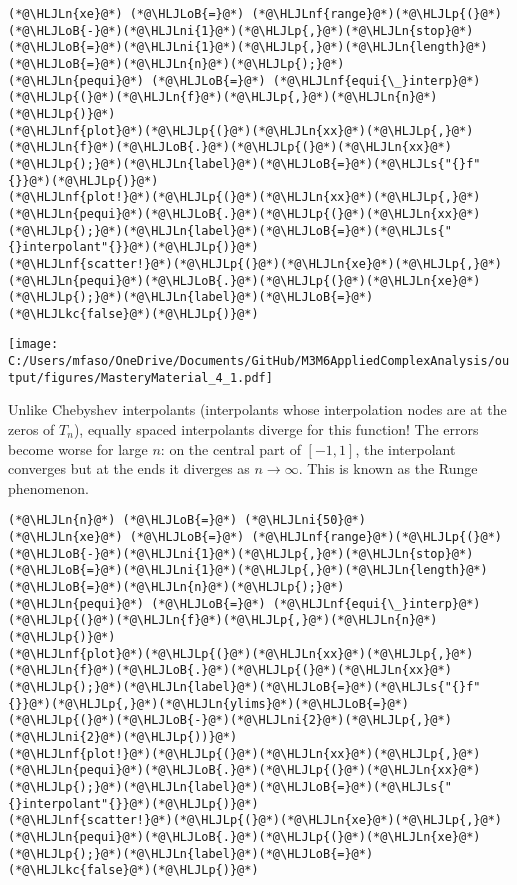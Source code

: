 \documentclass[12pt,a4paper]{article}
\newcommand{\HLJLkc}[1]{\textcolor[RGB]{59,151,46}{\textit{#1}}}
\newcommand{\HLJLn}[1]{#1}
\newcommand{\HLJLnf}[1]{\textcolor[RGB]{66,102,213}{#1}}
\newcommand{\HLJLs}[1]{\textcolor[RGB]{201,61,57}{#1}}
\newcommand{\HLJLni}[1]{\textcolor[RGB]{59,151,46}{#1}}
\newcommand{\HLJLoB}[1]{\textcolor[RGB]{102,102,102}{\textbf{#1}}}
\newcommand{\HLJLp}[1]{#1}
\begin{document}
\begin{lstlisting}
(*@\HLJLn{xe}@*) (*@\HLJLoB{=}@*) (*@\HLJLnf{range}@*)(*@\HLJLp{(}@*)(*@\HLJLoB{-}@*)(*@\HLJLni{1}@*)(*@\HLJLp{,}@*)(*@\HLJLn{stop}@*)(*@\HLJLoB{=}@*)(*@\HLJLni{1}@*)(*@\HLJLp{,}@*)(*@\HLJLn{length}@*)(*@\HLJLoB{=}@*)(*@\HLJLn{n}@*)(*@\HLJLp{);}@*)
(*@\HLJLn{pequi}@*) (*@\HLJLoB{=}@*) (*@\HLJLnf{equi{\_}interp}@*)(*@\HLJLp{(}@*)(*@\HLJLn{f}@*)(*@\HLJLp{,}@*)(*@\HLJLn{n}@*)(*@\HLJLp{)}@*)
(*@\HLJLnf{plot}@*)(*@\HLJLp{(}@*)(*@\HLJLn{xx}@*)(*@\HLJLp{,}@*)(*@\HLJLn{f}@*)(*@\HLJLoB{.}@*)(*@\HLJLp{(}@*)(*@\HLJLn{xx}@*)(*@\HLJLp{);}@*)(*@\HLJLn{label}@*)(*@\HLJLoB{=}@*)(*@\HLJLs{"{}f"{}}@*)(*@\HLJLp{)}@*)
(*@\HLJLnf{plot!}@*)(*@\HLJLp{(}@*)(*@\HLJLn{xx}@*)(*@\HLJLp{,}@*)(*@\HLJLn{pequi}@*)(*@\HLJLoB{.}@*)(*@\HLJLp{(}@*)(*@\HLJLn{xx}@*)(*@\HLJLp{);}@*)(*@\HLJLn{label}@*)(*@\HLJLoB{=}@*)(*@\HLJLs{"{}interpolant"{}}@*)(*@\HLJLp{)}@*)
(*@\HLJLnf{scatter!}@*)(*@\HLJLp{(}@*)(*@\HLJLn{xe}@*)(*@\HLJLp{,}@*)(*@\HLJLn{pequi}@*)(*@\HLJLoB{.}@*)(*@\HLJLp{(}@*)(*@\HLJLn{xe}@*)(*@\HLJLp{);}@*)(*@\HLJLn{label}@*)(*@\HLJLoB{=}@*)(*@\HLJLkc{false}@*)(*@\HLJLp{)}@*)
\end{lstlisting}

\texttt{[image: C:/Users/mfaso/OneDrive/Documents/GitHub/M3M6AppliedComplexAnalysis/output/figures/MasteryMaterial\_4\_1.pdf]}

Unlike Chebyshev interpolants (interpolants whose interpolation nodes are at the zeros of $T_n$), equally spaced interpolants diverge for this function! The errors become worse for large $n$: on the central part of $[-1,1]$, the interpolant converges but at the ends it diverges as $n\to \infty$. This is known as the Runge phenomenon.


\begin{lstlisting}
(*@\HLJLn{n}@*) (*@\HLJLoB{=}@*) (*@\HLJLni{50}@*)
(*@\HLJLn{xe}@*) (*@\HLJLoB{=}@*) (*@\HLJLnf{range}@*)(*@\HLJLp{(}@*)(*@\HLJLoB{-}@*)(*@\HLJLni{1}@*)(*@\HLJLp{,}@*)(*@\HLJLn{stop}@*)(*@\HLJLoB{=}@*)(*@\HLJLni{1}@*)(*@\HLJLp{,}@*)(*@\HLJLn{length}@*)(*@\HLJLoB{=}@*)(*@\HLJLn{n}@*)(*@\HLJLp{);}@*)
(*@\HLJLn{pequi}@*) (*@\HLJLoB{=}@*) (*@\HLJLnf{equi{\_}interp}@*)(*@\HLJLp{(}@*)(*@\HLJLn{f}@*)(*@\HLJLp{,}@*)(*@\HLJLn{n}@*)(*@\HLJLp{)}@*)
(*@\HLJLnf{plot}@*)(*@\HLJLp{(}@*)(*@\HLJLn{xx}@*)(*@\HLJLp{,}@*)(*@\HLJLn{f}@*)(*@\HLJLoB{.}@*)(*@\HLJLp{(}@*)(*@\HLJLn{xx}@*)(*@\HLJLp{);}@*)(*@\HLJLn{label}@*)(*@\HLJLoB{=}@*)(*@\HLJLs{"{}f"{}}@*)(*@\HLJLp{,}@*)(*@\HLJLn{ylims}@*)(*@\HLJLoB{=}@*)(*@\HLJLp{(}@*)(*@\HLJLoB{-}@*)(*@\HLJLni{2}@*)(*@\HLJLp{,}@*)(*@\HLJLni{2}@*)(*@\HLJLp{))}@*)
(*@\HLJLnf{plot!}@*)(*@\HLJLp{(}@*)(*@\HLJLn{xx}@*)(*@\HLJLp{,}@*)(*@\HLJLn{pequi}@*)(*@\HLJLoB{.}@*)(*@\HLJLp{(}@*)(*@\HLJLn{xx}@*)(*@\HLJLp{);}@*)(*@\HLJLn{label}@*)(*@\HLJLoB{=}@*)(*@\HLJLs{"{}interpolant"{}}@*)(*@\HLJLp{)}@*)
(*@\HLJLnf{scatter!}@*)(*@\HLJLp{(}@*)(*@\HLJLn{xe}@*)(*@\HLJLp{,}@*)(*@\HLJLn{pequi}@*)(*@\HLJLoB{.}@*)(*@\HLJLp{(}@*)(*@\HLJLn{xe}@*)(*@\HLJLp{);}@*)(*@\HLJLn{label}@*)(*@\HLJLoB{=}@*)(*@\HLJLkc{false}@*)(*@\HLJLp{)}@*)
\end{lstlisting}
\end{document}
